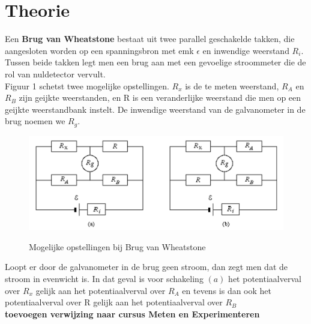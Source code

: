 \section{Theorie}

Een \textbf{Brug van Wheatstone} bestaat uit twee parallel geschakelde takken,
die aangesloten worden op een spanningsbron met emk $\epsilon$ en inwendige 
weerstand $R_{i}$. Tussen beide takken legt men een brug aan met een gevoelige
stroommeter die de rol van nuldetector vervult. 
\\

Figuur 1 schetst twee mogelijke opstellingen.
$R_{x}$ is de te meten weerstand, $R_{A}$ en $R_{B}$ zijn geijkte weerstanden, en R is een 
veranderlijke weerstand die men op een geijkte weerstandbank instelt. De inwendige weerstand 
van de galvanometer in de brug noemen we $R_{g}$.
\\

\begin{figure}[H]
    \centering
    \caption{Mogelijke opstellingen bij Brug van Wheatstone}
    \includegraphics[width=\textwidth]{img/brug.png}
    \label{fig:grafiek}
\end{figure}

Loopt er door de galvanometer in de brug geen stroom, dan zegt men dat de stroom in evenwicht is.
In dat geval is voor schakeling $(a)$ het potentiaalverval over $R_{x}$ gelijk aan het potentiaalverval 
over $R_{A}$ en tevens is dan ook het potentiaalverval over R gelijk aan het potentiaalverval over $R_{B}$
\\

\textbf{toevoegen verwijzing naar cursus Meten en Experimenteren}
